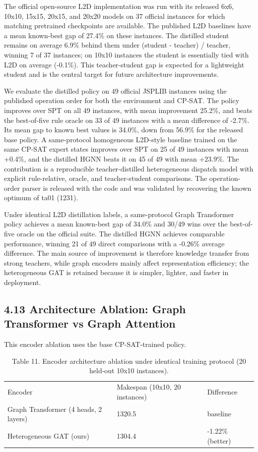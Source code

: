 \documentclass{article}
\begin{document}
The official open-source L2D implementation was run with its released 6x6, 10x10, 15x15, 20x15, and 20x20 models on 37 official instances for which matching pretrained checkpoints are available. The published L2D baselines have a mean known-best gap of 27.4\% on these instances. The distilled student remains on average 6.9\% behind them under (student - teacher) / teacher, winning 7 of 37 instances; on 10x10 instances the student is essentially tied with L2D on average (-0.1\%). This teacher-student gap is expected for a lightweight student and is the central target for future architecture improvements.

We evaluate the distilled policy on 49 official JSPLIB instances using the published operation order for both the environment and CP-SAT. The policy improves over SPT on all 49 instances, with mean improvement 25.2\%, and beats the best-of-five rule oracle on 33 of 49 instances with a mean difference of -2.7\%. Its mean gap to known best values is 34.0\%, down from 56.9\% for the released base policy. A same-protocol homogeneous L2D-style baseline trained on the same CP-SAT expert states improves over SPT on 25 of 49 instances with mean +0.4\%, and the distilled HGNN beats it on 45 of 49 with mean +23.9\%. The contribution is a reproducible teacher-distilled heterogeneous dispatch model with explicit rule-relative, oracle, and teacher-student comparisons. The operation-order parser is released with the code and was validated by recovering the known optimum of ta01 (1231).

Under identical L2D distillation labels, a same-protocol Graph Transformer policy achieves a mean known-best gap of 34.0\% and 30/49 wins over the best-of-five oracle on the official suite. The distilled HGNN achieves comparable performance, winning 21 of 49 direct comparisons with a -0.26\% average difference. The main source of improvement is therefore knowledge transfer from strong teachers, while graph encoders mainly affect representation efficiency; the heterogeneous GAT is retained because it is simpler, lighter, and faster in deployment.


\subsection*{4.13 Architecture Ablation: Graph Transformer vs Graph Attention}

This encoder ablation uses the base CP-SAT-trained policy.

\begin{table}[h]
\centering
\begin{tabular}{lll}
\toprule
Encoder & Makespan (10x10, 20 instances) & Difference \\
Graph Transformer (4 heads, 2 layers) & 1320.5 & baseline \\
Heterogeneous GAT (ours) & 1304.4 & -1.22\% (better) \\
\bottomrule
\end{tabular}
\caption{Table 11. Encoder architecture ablation under identical training protocol (20 held-out 10x10 instances).}
\end{table}
\end{document}
